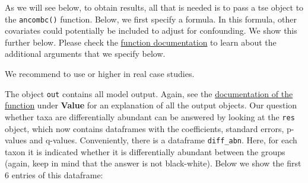 \documentclass[
]{book}
\newenvironment{Shaded}{\begin{snugshade}}{\end{snugshade}}
\newcommand{\AttributeTok}[1]{\textcolor[rgb]{0.77,0.63,0.00}{#1}}
\newcommand{\CommentTok}[1]{\textcolor[rgb]{0.56,0.35,0.01}{\textit{#1}}}
\newcommand{\ConstantTok}[1]{\textcolor[rgb]{0.00,0.00,0.00}{#1}}
\newcommand{\DecValTok}[1]{\textcolor[rgb]{0.00,0.00,0.81}{#1}}
\newcommand{\FloatTok}[1]{\textcolor[rgb]{0.00,0.00,0.81}{#1}}
\newcommand{\FunctionTok}[1]{\textcolor[rgb]{0.00,0.00,0.00}{#1}}
\newcommand{\NormalTok}[1]{#1}
\newcommand{\OtherTok}[1]{\textcolor[rgb]{0.56,0.35,0.01}{#1}}
\newcommand{\SpecialCharTok}[1]{\textcolor[rgb]{0.00,0.00,0.00}{#1}}
\newcommand{\StringTok}[1]{\textcolor[rgb]{0.31,0.60,0.02}{#1}}
\begin{document}
As we will see below, to obtain results, all that is needed is to pass
a tse object to the \texttt{ancombc()} function. Below, we first specify a
formula. In this formula, other covariates could potentially be
included to adjust for confounding. We show this further below.
Please check the \href{https://rdrr.io/github/FrederickHuangLin/ANCOMBC/man/ancombc.html}{function documentation}
to learn about the additional arguments that we specify below.

We recommend to use or higher in real case studies.

\begin{Shaded}
\end{Shaded}

The object \texttt{out} contains all model output. Again, see the
\href{https://rdrr.io/github/FrederickHuangLin/ANCOMBC/man/ancombc.html}{documentation of the function}
under \textbf{Value} for an explanation of all the output objects. Our question
whether taxa are differentially abundant can be answered by looking at the
\texttt{res} object, which now contains dataframes with the coefficients,
standard errors, p-values and q-values. Conveniently, there is a dataframe
\texttt{diff\_abn}. Here, for each taxon it is indicated whether it is differentially
abundant between the groups (again, keep in mind that the answer is not
black-white). Below we show the first 6 entries of this dataframe:
\end{document}
